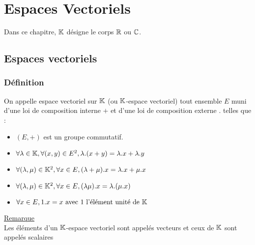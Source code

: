 \chapter{Espaces Vectoriels}

\minitoc
Dans ce chapitre, \(\mathbb{K}\) désigne le corps \(\mathbb{R}\) ou \(\mathbb{C}\).
\section{Espaces vectoriels}
\subsection{Définition}
\begin{defi}
    On appelle espace vectoriel sur \(\mathbb{K}\) (ou \( \mathbb{K}\)-espace vectoriel) tout ensemble \(E\) muni d’une loi de composition interne \(+\) et d’une loi de composition externe \(.\) telles que :
    \begin{itemize}
        \item \((E, +)\) est un groupe commutatif.
        \item \(\forall \lambda \in  \mathbb{K}, \forall (x, y) \in  E^2, \lambda.(x + y) = \lambda.x + \lambda.y\)
        \item \(\forall (\lambda, \mu ) \in  \mathbb{K}^2, \forall x \in  E, (\lambda + \mu ).x = \lambda.x + \mu .x\)
        \item \(\forall (\lambda, \mu ) \in  \mathbb{K}^2, \forall x \in  E, (\lambda\mu ).x = \lambda.(\mu .x)\)
        \item \(\forall x \in  E, 1.x = x \text{ avec }1 \text{ l’élément unité de }\mathbb{K}\)
    \end{itemize}
    \underline{Remarque}\\
    Les éléments d’un \(\mathbb{K}\)-espace vectoriel sont appelés vecteurs et ceux de \(\mathbb{K}\) sont appelés scalaires
\end{defi}

